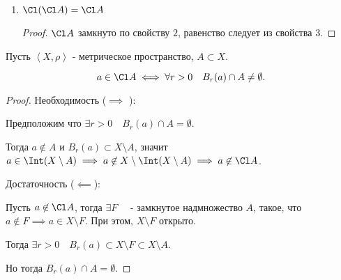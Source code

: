 \begin{properties}
\begin{enumerate}
\begin{proof}
                \begin{equation*}
                    \begin{split}
                        \Cl (A \cup B)
                        &= X \setminus \Int (X \setminus (A \cup B)\\
                        &= X \setminus \Int ((X \setminus A)\cap (X \setminus B))\\
                        &= X \setminus (\Int (X \setminus A)\cap \Int (X \setminus B))\\
                        &= (X \setminus \Int (X \setminus A)) \cup (X \setminus \Int (X \setminus B))\\
                        &= \Cl A \cup \Cl B \qedhere
                    \end{split}
                \end{equation*}
            \end{proof}
        \item $\Cl (\Cl A) = \Cl A$
             \begin{proof} \thmslashn
            
                $\Cl A$ замкнуто по свойству $2$, равенство следует из свойства $3$.
            \end{proof}
    \end{enumerate}
\end{properties}
\begin{theorem} \thmslashn

    Пусть $\left<X, \rho\right>$ - метрическое пространство, $A \subset X$.

    \[ a\in \Cl A \iff \forall{r > 0}\quad B_{r}(a)\cap A \neq \emptyset .\]

    \begin{proof} \thmslashn
    
        Необходимость ($\implies$ ):

        Предположим что $\exists{r > 0}\quad B_{r}(a)\cap A = \emptyset$.

        Тогда $a \not\in A$ и $B_{r}(a) \subset X \setminus A$, значит $a\in \Int (X \setminus A) \implies a \not\in X \setminus \Int(X \setminus A) \implies a\not\in \Cl A$.

        Достаточность ($\impliedby$):

        Пусть $a \not\in \Cl A$, тогда $\exists{F}\quad $ - замкнутое надмножество $A$, такое, что $a \not\in F \implies a\in X \setminus F$. При этом, $X \setminus F$ открыто.

        Тогда $\exists{r > 0}\quad B_{r}(a) \subset X \setminus F \subset X \setminus A$.

        Но тогда $B_{r}(a)\cap A = \emptyset$.
    \end{proof}
\end{theorem}
